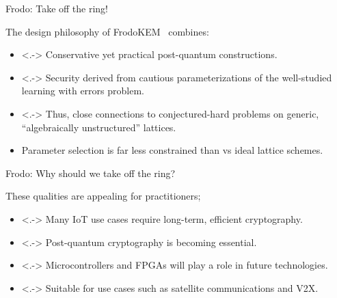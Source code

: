 \documentclass{beamer}            %
\begin{document}
%
%


\begin{frame}{Frodo: Take off the ring!}

The design philosophy of \textsf{FrodoKEM}~\cite{frodo-nist} combines:

\begin{itemize}[<+->]
\item<.-> Conservative yet practical post-quantum constructions.

\item<.-> Security derived from cautious parameterizations of the well-studied learning with errors problem. 

\item<.-> Thus, close connections to conjectured-hard problems on generic, ``algebraically unstructured'' lattices.

\item Parameter selection is far less constrained than vs ideal lattice schemes.

\end{itemize}

\end{frame}


\begin{frame}{Frodo: Why should we take off the ring?}

These qualities are appealing for practitioners;

\begin{itemize}[<+->]
\item<.-> Many IoT use cases require long-term, efficient cryptography.

\item<.-> Post-quantum cryptography is becoming essential.

\item<.-> Microcontrollers and FPGAs will play a role in future technologies.

\item<.-> Suitable for use cases such as satellite communications and V2X.

\end{itemize}

\end{frame}
\end{document}
